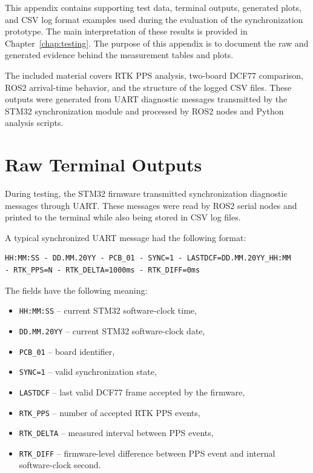 This appendix contains supporting test data, terminal outputs, generated plots, and CSV log format examples used during the evaluation of the synchronization prototype. The main interpretation of these results is provided in Chapter~\ref{chap:testing}. The purpose of this appendix is to document the raw and generated evidence behind the measurement tables and plots.

The included material covers RTK PPS analysis, two-board DCF77 comparison, ROS2 arrival-time behavior, and the structure of the logged CSV files. These outputs were generated from UART diagnostic messages transmitted by the STM32 synchronization module and processed by ROS2 nodes and Python analysis scripts.

\section{Raw Terminal Outputs}
\label{app:rawTerminalOutputs}

During testing, the STM32 firmware transmitted synchronization diagnostic messages through UART. These messages were read by ROS2 serial nodes and printed to the terminal while also being stored in CSV log files.

A typical synchronized UART message had the following format:

\begin{verbatim}
HH:MM:SS - DD.MM.20YY - PCB_01 - SYNC=1 - LASTDCF=DD.MM.20YY_HH:MM
- RTK_PPS=N - RTK_DELTA=1000ms - RTK_DIFF=0ms
\end{verbatim}

The fields have the following meaning:
\begin{itemize}
    \item \texttt{HH:MM:SS} -- current STM32 software-clock time,
    \item \texttt{DD.MM.20YY} -- current STM32 software-clock date,
    \item \texttt{PCB\_01} -- board identifier,
    \item \texttt{SYNC=1} -- valid synchronization state,
    \item \texttt{LASTDCF} -- last valid DCF77 frame accepted by the firmware,
    \item \texttt{RTK\_PPS} -- number of accepted RTK PPS events,
    \item \texttt{RTK\_DELTA} -- measured interval between PPS events,
    \item \texttt{RTK\_DIFF} -- firmware-level difference between PPS event and internal software-clock second.
\end{itemize}


